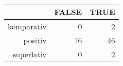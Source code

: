 \begin{tabular}{rrr}
  \hline
 & FALSE & TRUE \\ 
  \hline
komparativ & 0 & 2 \\ 
  positiv & 16 & 46 \\ 
  superlativ & 0 & 2 \\ 
   \hline
\end{tabular}

